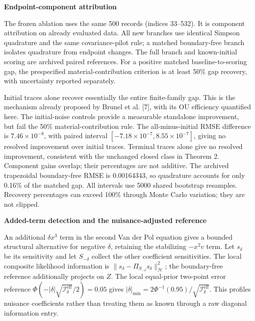 \documentclass[
  american,
  11pt,
]{article}
\begin{document}
\textbf{Endpoint-component attribution}

The frozen ablation uses the same 500 records (indices 33--532). It is
component attribution on already evaluated data. All new branches use
identical Simpson quadrature and the same covariance-pilot rule; a
matched boundary-free branch isolates quadrature from endpoint changes.
The full branch and known-initial scoring are archived paired
references. For a positive matched baseline-to-scoring gap, the
prespecified material-contribution criterion is at least 50\% gap
recovery, with uncertainty reported separately.

Initial traces alone recover essentially the entire finite-family gap.
This is the mechanism already proposed by Brunel et al. {[}7{]}, with
its OU efficiency quantified here. The initial-noise controls provide a
measurable standalone improvement, but fail the 50\%
material-contribution rule. The all-minus-initial RMSE difference is
\(7.46\times10^{-8}\), with paired interval
\([-7.18\times10^{-7},8.55\times10^{-7}]\), giving no resolved
improvement over initial traces. Terminal traces alone give no resolved
improvement, consistent with the unchanged closed class in Theorem 2.
Component gains overlap; their percentages are not additive. The
archived trapezoidal boundary-free RMSE is 0.00164343, so quadrature
accounts for only 0.16\% of the matched gap. All intervals use 5000
shared bootstrap resamples. Recovery percentages can exceed 100\%
through Monte Carlo variation; they are not clipped.

\textbf{Added-term detection and the nuisance-adjusted reference}

An additional \(\delta x^3\) term in the second Van der Pol equation
gives a bounded structural alternative for negative \(\delta\),
retaining the stabilizing \(-x^2v\) term. Let \(s_\delta\) be its
sensitivity and let \(S_{-\delta}\) collect the other coefficient
sensitivities. The local composite likelihood information is
\(\|s_\delta-\Pi_{S_{-\delta}}s_\delta\|_{\mathcal H}^2\); the
boundary-free reference additionally projects on \(Z\). The local
equal-prior two-point error reference
\(\Phi(-|\delta|\sqrt{\mathcal I^{\mathrm{eff}}_{\delta}}/2)=0.05\)
gives
\(|\delta|_{\min}=2\Phi^{-1}(0.95)/\sqrt{\mathcal I^{\mathrm{eff}}_{\delta}}\).
This profiles nuisance coefficients rather than treating them as known
through a raw diagonal information entry.
\end{document}
